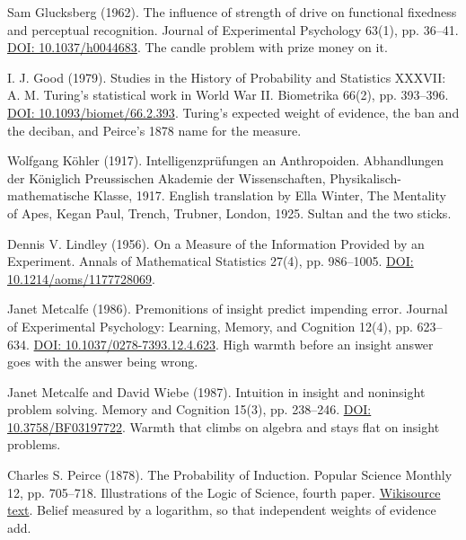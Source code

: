 \noindent Sam Glucksberg (1962). The influence of strength of drive on functional fixedness and perceptual recognition. Journal of Experimental Psychology 63(1), pp. 36--41. \href{https://doi.org/10.1037/h0044683}{DOI: 10.1037/h0044683}. The candle problem with prize money on it.
\par\medskip

\noindent I. J. Good (1979). Studies in the History of Probability and Statistics XXXVII: A. M. Turing's statistical work in World War II. Biometrika 66(2), pp. 393--396. \href{https://doi.org/10.1093/biomet/66.2.393}{DOI: 10.1093/biomet/66.2.393}. Turing's expected weight of evidence, the ban and the deciban, and Peirce's 1878 name for the measure.
\par\medskip

\noindent Wolfgang K\"ohler (1917). Intelligenzpr\"ufungen an Anthropoiden. Abhandlungen der K\"oniglich Preussischen Akademie der Wissenschaften, Physikalisch-mathematische Klasse, 1917. English translation by Ella Winter, The Mentality of Apes, Kegan Paul, Trench, Trubner, London, 1925. Sultan and the two sticks.
\par\medskip

\noindent Dennis V. Lindley (1956). On a Measure of the Information Provided by an Experiment. Annals of Mathematical Statistics 27(4), pp. 986--1005. \href{https://doi.org/10.1214/aoms/1177728069}{DOI: 10.1214/aoms/1177728069}.
\par\medskip

\noindent Janet Metcalfe (1986). Premonitions of insight predict impending error. Journal of Experimental Psychology: Learning, Memory, and Cognition 12(4), pp. 623--634. \href{https://doi.org/10.1037/0278-7393.12.4.623}{DOI: 10.1037/0278-7393.12.4.623}. High warmth before an insight answer goes with the answer being wrong.
\par\medskip

\noindent Janet Metcalfe and David Wiebe (1987). Intuition in insight and noninsight problem solving. Memory and Cognition 15(3), pp. 238--246. \href{https://doi.org/10.3758/BF03197722}{DOI: 10.3758/BF03197722}. Warmth that climbs on algebra and stays flat on insight problems.
\par\medskip

\noindent Charles S. Peirce (1878). The Probability of Induction. Popular Science Monthly 12, pp. 705--718. Illustrations of the Logic of Science, fourth paper. \href{https://en.wikisource.org/wiki/Popular_Science_Monthly/Volume_12/April_1878/Illustrations_of_the_Logic_of_Science_IV}{Wikisource text}. Belief measured by a logarithm, so that independent weights of evidence add.
\par\medskip

